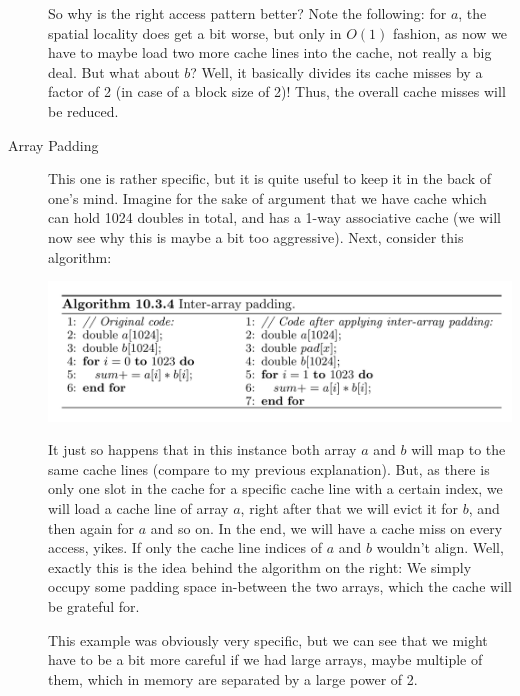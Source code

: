 \documentclass[../../main.tex]{subfiles}
\begin{document}
\begin{description}
    So why is the right access pattern better? Note the following: for $a$, the spatial locality does get a bit worse, but only in $O(1)$ fashion, as now we have to maybe load two more cache lines into the cache, not really a big deal. But what about $b$? Well, it basically divides its cache misses by a factor of 2 (in case of a block size of 2)! Thus, the overall cache misses will be reduced.

    \item[Array Padding] This one is rather specific, but it is quite useful to keep it in the back of one's mind. Imagine for the sake of argument that we have cache which can hold 1024 doubles in total, and has a 1-way associative cache (we will now see why this is maybe a bit too aggressive). Next, consider this algorithm:
    
    \includegraphics[width=\linewidth]{chapters/09/array_padding.png}
    
    It just so happens that in this instance both array $a$ and $b$ will map to the same cache lines (compare to my previous explanation). But, as there is only one slot in the cache for a specific cache line with a certain index, we will load a cache line of array $a$, right after that we will evict it for $b$, and then again for $a$ and so on. In the end, we will have a cache miss on every access, yikes. If only the cache line indices of $a$ and $b$ wouldn't align. Well, exactly this is the idea behind the algorithm on the right: We simply occupy some padding space in-between the two arrays, which the cache will be grateful for.

    This example was obviously very specific, but we can see that we might have to be a bit more careful if we had large arrays, maybe multiple of them, which in memory are separated by a large power of 2.
\end{description}
\end{document}
